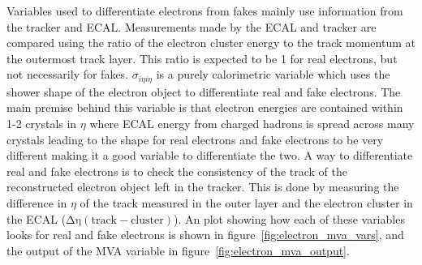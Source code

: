Variables used to differentiate electrons from fakes mainly use information from the tracker and ECAL.
Measurements made by the ECAL and tracker are compared using the ratio of the electron cluster energy to the track momentum at the outermost track layer.
This ratio is expected to be 1 for real electrons, but not necessarily for fakes.
$\sigma_{i\eta i\eta}$ is a purely calorimetric variable which uses the shower shape of the electron object to differentiate real and fake electrons.
The main premise behind this variable is that electron energies are contained within 1-2 crystals in $\eta$
where ECAL energy from charged hadrons is spread across many crystals leading to the shape for real electrons and fake electrons to be very different making it a good variable to differentiate the two.
A way to differentiate real and fake electrons is to check the consistency of the track of the reconstructed electron object left in the tracker.
This is done by measuring the difference in $\eta$ of the track measured in the outer layer and the electron cluster in the ECAL ($\mathrm{\Delta\eta(track-cluster)}$).
An plot showing how each of these variables looks for real and fake electrons is shown in figure~\ref{fig:electron_mva_vars},
and the output of the MVA variable in figure~\ref{fig:electron_mva_output}.

